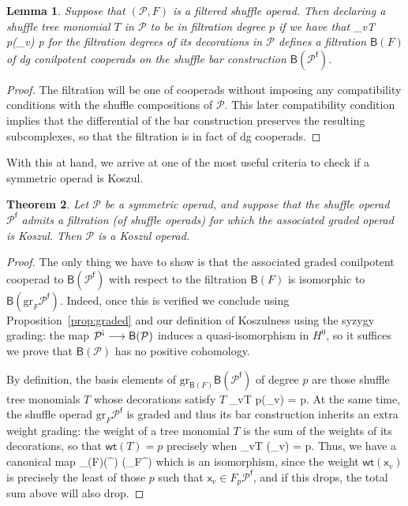 \documentclass[fleqn, a4paper, twoside]{article}
\makeatletter
\newcommand{\antishriek}{\text{\raisebox{\depth}{\textexclamdown}}}
\newcommand{\0}{\langle 0\rangle}
\newcommand{\B}[1]{\mathsf{B}(#1)}
\newcommand{\f}{\mathsf{f}}
\let\[\@undefined
\DeclareRobustCommand{\[}{\begin{equation}}%
\let\]\@undefined
\DeclareRobustCommand{\]}{\end{equation}}%
\theoremstyle{mytheorem}
\newtheorem{theorem}{Theorem}[section]
\newtheorem{lemma}[theorem]{Lemma}
\theoremstyle{introthm}
\theoremstyle{mydefinition}
\theoremstyle{mydefinition2}
\theoremstyle{plain} %
\newcommand{\?}{\,?\,}
\newcommand{\PP}{{\mathcal{P}}}
\theoremstyle{mytheorem}
\theoremstyle{plain} %
\makeatother
\begin{document}
 \begin{lemma}
 Suppose that $(\PP,F)$ is a filtered shuffle operad.
 Then declaring a shuffle tree monomial $T$ in $\PP$
 to be in filtration degree $p$ if we have that
 \[\sum_{v\in T} p(_v) \leqslant p \]
 for the filtration degrees of its decorations
 in $\PP$ defines a filtration $\B{F}$ 
 of dg conilpotent
 cooperads on the shuffle bar construction
 $\B{\PP^\f}$.
 \end{lemma}
 
 \begin{proof}
 The filtration will be one of cooperads without
 imposing any compatibility conditions with the
 shuffle compositions of $\PP$. This
 later compatibility condition implies that
 the differential of the bar construction
 preserves the resulting subcomplexes,
 so that the filtration is in fact of dg
 cooperads.  \end{proof}
 
 With this at hand, we arrive at one of the most
 useful criteria to check if a symmetric operad
 is Koszul.
 
 \begin{theorem}
 Let $\PP$ be a symmetric operad, and suppose
 that the shuffle operad $\PP^\f$ admits
 a filtration (of shuffle operads) for which
 the associated graded operad is Koszul.
 Then $\PP$ is a Koszul operad.
 \end{theorem}
 
 \begin{proof}
 The only thing we have to show is that the
 associated graded conilpotent cooperad to
 $\B{\PP^\f}$ with respect to the filtration
 $\B{F}$ is isomorphic to $\B{\mathrm{gr}_F\PP^\f}$.
 Indeed, once this is verified we conclude using
 Proposition~\ref{prop:graded} and our definition
 of Koszulness using the syzygy grading: the
 map $\PP^\antishriek \longrightarrow \B{\PP}$
 induces a quasi-isomorphism in $H^0$, so it suffices
 we prove that $\B{\PP}$ has no positive cohomology.
 
 By definition, the basis elements of
 $\mathrm{gr}_{\B{F}}\B{\PP^\f}$ of degree $p$
 are those shuffle tree monomials $T$
 whose decorations satisfy $T$
 \[
 \sum_{v\in T} p(_v) = p.
 \]
 At the same time, the shuffle operad 
 $\mathrm{gr}_F\PP^\f$  is graded and 
 thus its bar construction inherits an
 extra weight grading: the weight of a tree
 monomial $T$ is the sum of the weights of its
 decorations, so that $\mathsf{wt}(T)= p$
 precisely when
 \[
 \sum_{v\in T} (_v) = p.
 \]
 Thus, we have a canonical map
 \[
 _{\B{F}}\B{\PP^\f} \longrightarrow
 \B{_F\PP^\f}
 \]
 which is an isomorphism, since the weight
 $\mathsf{wt}(\mathsf{x}_v)$ is precisely
 the least of those $p$ such that $\mathsf{x}_v
 \in F_p\PP^\f$, and if this drops, the total sum above
 will also drop. 
 \end{proof}
 
\end{document}
